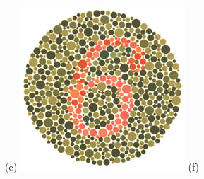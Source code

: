 \documentclass[	12pt, Times, openright, twoside, a4paper, english, brazil]{abntex2}
\begin{document}
\begin{apendicesenv}
\begin{figure}[!htb]
(e)
\endminipage\hfill
{}
\centering
{\includegraphics[width=\linewidth]{ishihara-transformacao/plate3.jpg}}
(f)
\endminipage\hfill


\end{figure}
\end{apendicesenv}
\end{document}
